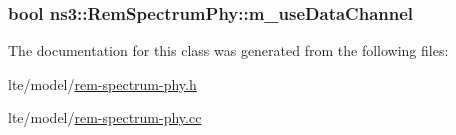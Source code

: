 \subsubsection[{\texorpdfstring{m\+\_\+use\+Data\+Channel}{m_useDataChannel}}]{\setlength{\rightskip}{0pt plus 5cm}bool ns3\+::\+Rem\+Spectrum\+Phy\+::m\+\_\+use\+Data\+Channel\hspace{0.3cm}{\ttfamily [private]}}\hypertarget{classns3_1_1RemSpectrumPhy_af2cc6a40b67d0d47bbddfee708479779}{}\label{classns3_1_1RemSpectrumPhy_af2cc6a40b67d0d47bbddfee708479779}


The documentation for this class was generated from the following files\+:\begin{DoxyCompactItemize}
\item 
lte/model/\hyperlink{lte_2model_2rem-spectrum-phy_8h}{rem-\/spectrum-\/phy.\+h}\item 
lte/model/\hyperlink{lte_2model_2rem-spectrum-phy_8cc}{rem-\/spectrum-\/phy.\+cc}\end{DoxyCompactItemize}
